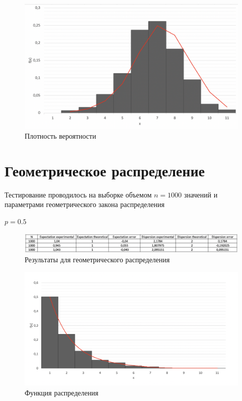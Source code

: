 \documentclass{article}
\begin{document}
		\begin{figure}[!htb]
			\includegraphics[scale = 0.32]{binom/1}
			\caption{Плотность вероятности}
   		\end{figure}
	\newpage
	\section{Геометрическое распределение}
		Тестирование проводилось на выборке объемом $n = 1000$ значений и параметрами геометрического закона распределения
		\begin{center}
			$p = 0.5$\\
		\end{center}
		\begin{center}
			\begin{figure}[!htb]
				\includegraphics[scale = 0.5]{geom/3.png}
				\caption{Результаты для геометрического распределения}
			\end{figure}
		\end{center}
		
		\begin{figure}[!htb]
		    \includegraphics[scale = 0.34]{geom/2.png}
    		\caption{Функция распределения}
		\end{figure}
		 	 	
\end{document}
